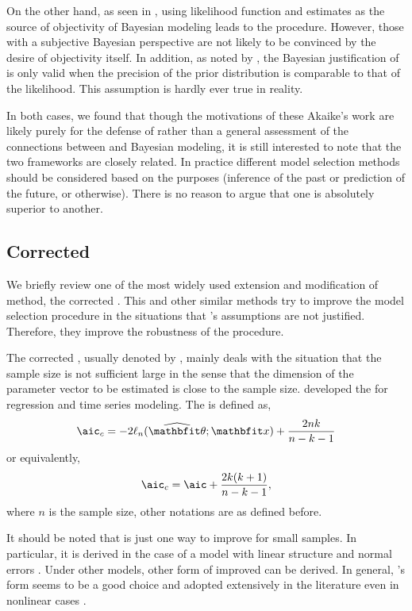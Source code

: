 \documentclass[11pt, hyper, bib, fontset=Minion]{marticle}
\begin{document}
On the other hand, as seen in \textcite{Akaike:1980gh}, using likelihood
function and \aic estimates as the source of objectivity of Bayesian
modeling leads to the \bic procedure. However, those with a subjective
Bayesian perspective are not likely to be convinced by the desire of
objectivity itself. In addition, as noted by \textcite{Kass:1995vb}, the
Bayesian justification of \aic is only valid when the precision of the prior
distribution is comparable to that of the likelihood. This assumption is
hardly ever true in reality.

In both cases, we found that though the motivations of these Akaike's work are
likely purely for the defense of \aic rather than a general assessment of the
connections between \aic and Bayesian modeling, it is still interested to note
that the two frameworks are closely related. In practice different model
selection methods should be considered based on the purposes (inference of the
past or prediction of the future, or otherwise). There is no reason to argue
that one is absolutely superior to another.

\subsection{Corrected \protect\aic}
\label{sub:Corrected aic}

We briefly review one of the most widely used extension and modification of
\aic method, the corrected \aic. This and other similar methods try to improve
the model selection procedure in the situations that
\textcite{Akaike:1973uc}'s assumptions are not justified. Therefore, they
improve the robustness of the \aic procedure.

The corrected \aic, usually denoted by \aicc, mainly deals with the situation
that the sample size is not sufficient large in the sense that the dimension
of the parameter vector to be estimated is close to the sample size.
\textcite{Hurvich:1989ev} developed the \aicc for regression and time series
modeling. The \aicc is defined as,
\begin{equation}
  \text{\aicc} = -2\ell_n(\hbth;\bfx) + \frac{2nk}{n-k-1}
\end{equation}
or equivalently,
\begin{equation}
  \text{\aicc} = \text{\aic} + \frac{2k(k+1)}{n-k-1},
\end{equation}
where $n$ is the sample size, other notations are as defined before.

It should be noted that \aicc is just one way to improve \aic for small
samples. In particular, it is derived in the case of a model with linear
structure and normal errors \parencite{Hurvich:1989ev, Burnham:2002wc}. Under
other models, other form of improved \aic can be derived. In general,
\textcite{Hurvich:1989ev}'s form seems to be a good choice and adopted
extensively in the literature even in nonlinear cases
\parencite[e.g.,][]{Turkheimer:2003iy}.
\end{document}
